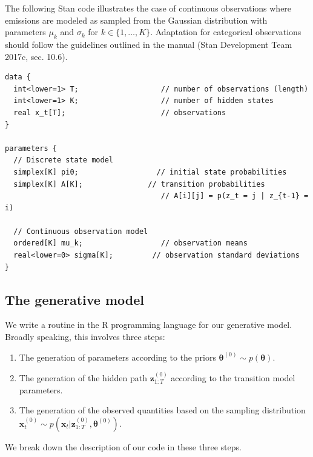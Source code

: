 \documentclass[]{article}
\providecommand{\tightlist}{%
  \setlength{\itemsep}{0pt}\setlength{\parskip}{0pt}}
\newcommand{\mat}[1]{\mathbf{#1}}
\begin{document}
The following Stan code illustrates the case of continuous observations
where emissions are modeled as sampled from the Gaussian distribution
with parameters \(\mu_k\) and \(\sigma_k\) for
\(k \in \{1, \dots, K\}\). Adaptation for categorical observations
should follow the guidelines outlined in the manual (Stan Development
Team 2017c, sec. 10.6).

\begin{verbatim}
data {
  int<lower=1> T;                   // number of observations (length)
  int<lower=1> K;                   // number of hidden states
  real x_t[T];                      // observations
}

parameters {
  // Discrete state model
  simplex[K] pi0;                  // initial state probabilities
  simplex[K] A[K];               // transition probabilities
                                    // A[i][j] = p(z_t = j | z_{t-1} = i)

  // Continuous observation model
  ordered[K] mu_k;                  // observation means
  real<lower=0> sigma[K];         // observation standard deviations
}
\end{verbatim}

\subsection{The generative model}\label{the-generative-model}

We write a routine in the R programming language for our generative
model. Broadly speaking, this involves three steps:

\begin{enumerate}
\def\labelenumi{\arabic{enumi}.}
\tightlist
\item
  The generation of parameters according to the priors
  \(\mat{\theta}^{(0)} \sim p(\mat{\theta})\).
\item
  The generation of the hidden path \(\mat{z}_{1:T}^{(0)}\) according to
  the transition model parameters.
\item
  The generation of the observed quantities based on the sampling
  distribution
  \(\mat{x}_t^{(0)} \sim p(\mat{x}_t | \mat{z}_{1:T}^{(0)}, \mat{\theta}^{(0)})\).
\end{enumerate}

We break down the description of our code in these three steps.
\end{document}
